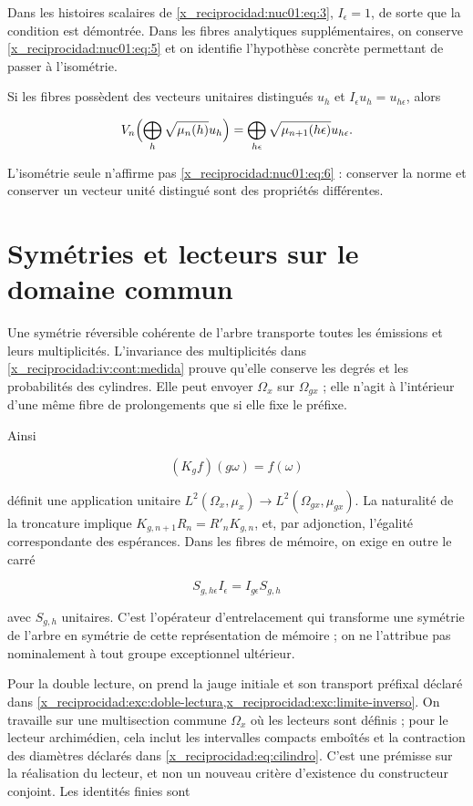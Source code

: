 Dans les histoires scalaires de \eqref{x_reciprocidad:nuc01:eq:3}, \(I_\epsilon=1\), de sorte que la condition est démontrée. Dans les fibres analytiques supplémentaires, on conserve \eqref{x_reciprocidad:nuc01:eq:5} et on identifie l’hypothèse concrète permettant de passer à l’isométrie.

Si les fibres possèdent des vecteurs unitaires distingués \(u_h\) et \(I_\epsilon u_h=u_{h\epsilon}\), alors

\begin{equation}
V_n\Bigl(\bigoplus_h\sqrt{\mu_n(h)}u_h\Bigr)
=\bigoplus_{h\epsilon}\sqrt{\mu_{n+1}(h\epsilon)}u_{h\epsilon}.
\label{x_reciprocidad:nuc01:eq:6}
\end{equation}

L’isométrie seule n’affirme pas \eqref{x_reciprocidad:nuc01:eq:6} : conserver la norme et conserver un vecteur unité distingué sont des propriétés différentes.

\section{Symétries et lecteurs sur le domaine commun}

Une symétrie réversible cohérente de l’arbre transporte toutes les émissions et leurs multiplicités. L’invariance des multiplicités dans \cref{x_reciprocidad:iv:cont:medida} prouve qu’elle conserve les degrés et les probabilités des cylindres. Elle peut envoyer \(\Omega_x\) sur \(\Omega_{gx}\) ; elle n’agit à l’intérieur d’une même fibre de prolongements que si elle fixe le préfixe.

Ainsi

\[
(K_gf)(g\omega)=f(\omega)
\]

définit une application unitaire \(L^2(\Omega_x,\mu_x)\to L^2(\Omega_{gx},\mu_{gx})\). La naturalité de la troncature implique \(K_{g,n+1}R_n=R'_nK_{g,n}\), et, par adjonction, l’égalité correspondante des espérances. Dans les fibres de mémoire, on exige en outre le carré

\[
S_{g,h\epsilon}I_\epsilon=I_{g\epsilon}S_{g,h}
\]

avec \(S_{g,h}\) unitaires. C’est l’opérateur d’entrelacement qui transforme une symétrie de l’arbre en symétrie de cette représentation de mémoire ; on ne l’attribue pas nominalement à tout groupe exceptionnel ultérieur.

Pour la double lecture, on prend la jauge initiale et son transport préfixal déclaré dans \cref{x_reciprocidad:exc:doble-lectura,x_reciprocidad:exc:limite-inverso}. On travaille sur une multisection commune \(\Omega_x\) où les lecteurs sont définis ; pour le lecteur archimédien, cela inclut les intervalles compacts emboîtés et la contraction des diamètres déclarés dans \eqref{x_reciprocidad:eq:cilindro}. C’est une prémisse sur la réalisation du lecteur, et non un nouveau critère d’existence du constructeur conjoint. Les identités finies sont

